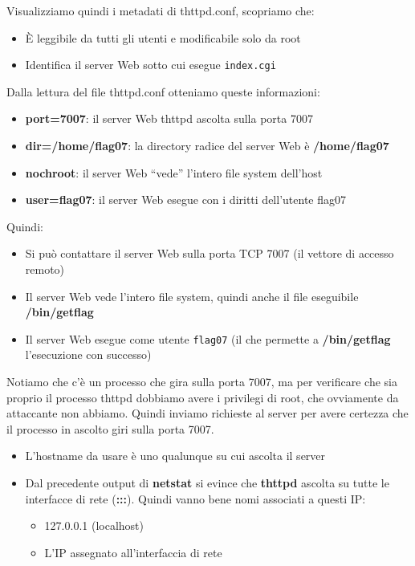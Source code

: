 Visualizziamo quindi i metadati di thttpd.conf, scopriamo che:
\begin{itemize}
    \item È leggibile da tutti gli utenti e modificabile solo da root
    \item Identifica il server Web sotto cui esegue \texttt{index.cgi}
\end{itemize}
Dalla lettura del file thttpd.conf otteniamo queste informazioni:
\begin{itemize}
    \item \textbf{port=7007}: il server Web thttpd ascolta sulla porta 7007
    \item \textbf{dir=/home/flag07}: la directory radice del server Web è \textbf{/home/flag07}
    \item \textbf{nochroot}: il server Web “vede” l'intero file system dell'host
    \item \textbf{user=flag07}: il server Web esegue con i diritti dell'utente flag07
\end{itemize}
Quindi:
\begin{itemize}
    \item Si può contattare il server Web sulla porta TCP 7007 (il vettore di accesso remoto)
    \item Il server Web vede l'intero file system, quindi anche il file eseguibile \textbf{/bin/getflag}
    \item Il server Web esegue come utente \texttt{flag07} (il che permette a \textbf{/bin/getflag} l'esecuzione con successo)
\end{itemize}
Notiamo che c’è un processo che gira sulla porta 7007, ma per verificare che sia proprio il processo thttpd dobbiamo avere i privilegi di root, che ovviamente da attaccante non abbiamo.
Quindi inviamo richieste al server per avere certezza che il processo in ascolto giri sulla porta 7007. 
\begin{itemize}
    \item L'hostname da usare è uno qualunque su cui ascolta il server
    \item Dal precedente output di \textbf{netstat} si evince che \textbf{thttpd} ascolta su tutte le interfacce di rete (\textbf{:::}). Quindi vanno bene nomi associati a questi IP:
    \begin{itemize}
        \item 127.0.0.1 (localhost)
        \item L'IP assegnato all'interfaccia di rete
    \end{itemize}
\end{itemize}
